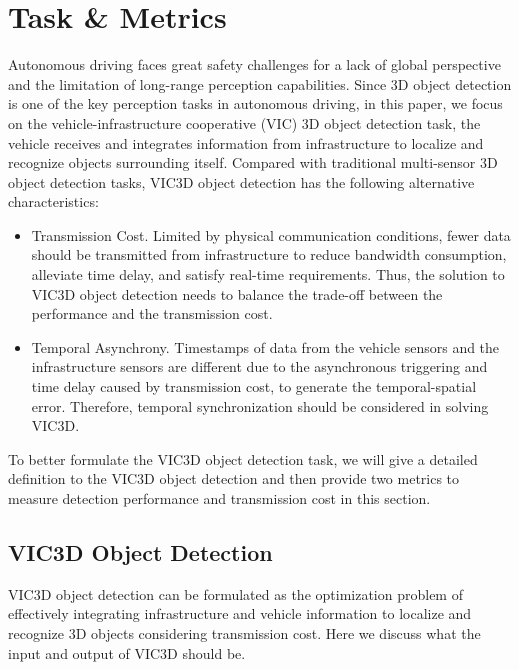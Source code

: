 \section{Task \& Metrics}
Autonomous driving faces great safety challenges for a lack of global perspective and the limitation of long-range perception capabilities. 
Since 3D object detection is one of the key perception tasks in autonomous driving, in this paper, we focus on the vehicle-infrastructure cooperative (VIC) 3D object detection task, the vehicle receives and integrates information from infrastructure to localize and recognize objects surrounding itself.
Compared with traditional multi-sensor 3D object detection tasks, VIC3D object detection has the following alternative characteristics:
\begin{itemize}
\item Transmission Cost. Limited by physical communication conditions, fewer data should be transmitted from infrastructure to reduce bandwidth consumption, alleviate time delay, and satisfy real-time requirements. Thus, the solution to VIC3D object detection needs to balance the trade-off between the performance and the transmission cost.
\item Temporal Asynchrony. Timestamps of data from the vehicle sensors and the infrastructure sensors are different due to the asynchronous triggering and time delay caused by transmission cost, to generate the temporal-spatial error. Therefore, temporal synchronization should be considered in solving VIC3D.
\end{itemize}

To better formulate the VIC3D object detection task, we will give a detailed definition to the VIC3D object detection and then provide two metrics to measure detection performance and transmission cost in this section. 

\subsection{VIC3D Object Detection} \label{sec: vic3d object detection}
VIC3D object detection can be formulated as the optimization problem of effectively integrating infrastructure and vehicle information to localize and recognize 3D objects considering transmission cost.
Here we discuss what the input and output of VIC3D should be. \\


